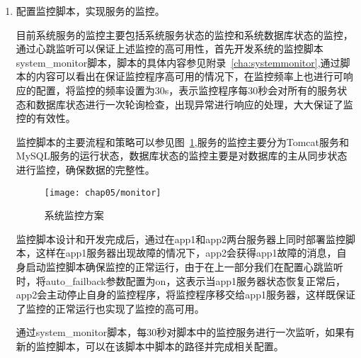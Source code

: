 \begin{enumerate}
authkeys主配置文件配置如下:
\begin{lstlisting}[numbers=none]
auth 2
#1 crc
2 sha1 mimaminishop
#3 md5 somewords
\end{lstlisting}
此文件为不同集群中 heartbeat 节点进行连接的认证文件， 不同集群中该文件采用的算法和密钥必须相同，认证方式有 3 种算法:crc方式、md5加密方式和sha1哈希方式。三种方式中 crc方式只能够校验节点间通信的校验数据包是否损坏，不能进行安全性认证； sha1/md5 两种方式需要进行安全性认证，它们通过一个密钥来进行认证。sha1和md5两种方式相比，sh1方式的资源消耗远小于md5方式，因此在大多数应用中建议使用 sha1 方式\cite{heartbeat配置说明}。

可以看出，示例中使用的是sha1算法，如果要换用其他算法只需要修改auth指令后面的数字，然后取消相应行的注释即可。另外，该文件的属性必须为600，否则heartbeat启动将失败。

haresources主配置文件配置如下:
\begin{lstlisting}[numbers=none]
app1 system_monitor
\end{lstlisting}
这表示Heartbeat启动时会执行资源路径中的system\_monitor脚本，实现服务的监控。

\item 配置监控脚本，实现服务的监控。

目前系统服务的监控主要包括系统服务状态的监控和系统数据库状态的监控，通过心跳监听可以保证上述监控的高可用性，首先开发系统的监控脚本system\_monitor脚本，脚本的具体内容参见附录~\ref{cha:systemmonitor},通过脚本的内容可以看出在保证监控程序高可用的情况下，在监控频率上也进行可响应的配置，将监控的频率设置为30s，表示监控程序每30秒会对所有的服务状态和数据库状态进行一次轮询检查，出现异常进行响应的处理，大大保证了监控的有效性。

监控脚本的主要流程和策略可以参见图~\ref{fig:systemmonitor},服务的监控主要分为Tomcat服务和MySQL服务的运行状态，数据库状态的监控主要是对数据库的主从同步状态进行监控，确保数据的完整性。
\begin{figure}[H] %
  \centering
  \texttt{[image: chap05/monitor]}
  \caption{系统监控方案}
  \label{fig:systemmonitor}
\end{figure}

监控脚本设计和开发完成后，通过在app1和app2两台服务器上同时部署监控脚本，这样在app1服务器出现故障的情况下，app2会获得app1故障的消息，自身启动监控脚本确保监控的正常运行，由于在上一部分我们在配置心跳监听时，将auto\_failback参数配置为on，这表示当app1服务器状态恢复正常后，app2会主动停止自身的监控程序，将监控程序移交给app1服务器，这样既保证了监控的正常运行也实现了监控的高可用。

通过system\_monitor脚本，每30秒对脚本中的监控服务进行一次监听，如果有新的监控脚本，可以在该脚本中脚本的路径并完成相关配置。
\end{enumerate}

